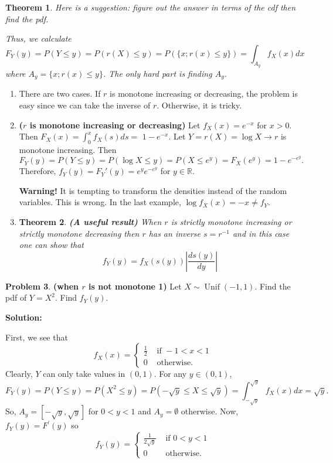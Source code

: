 \documentclass[13pt]{article}
\newtheorem{theorem}{Theorem}[section]
\theoremstyle{definition}
\newtheorem{problem}[theorem]{Problem}
\newenvironment{solution}
{\color{C2}\begin{framed}\begingroup\textbf{Solution:} }
  {\endgroup\end{framed}}
\theoremstyle{remark}
\newenvironment{remark}
  {\pushQED{\qed}\renewcommand{\qedsymbol}{$\triangle$}\remarkx}
  {\popQED\endremarkx}
\begin{document}
\begin{theorem}Here is a suggestion: figure out the answer in terms of the cdf then find the pdf. 

Thus, we calculate
$$
F_{Y}(y)=P(Y \leq y)=P(r(X) \leq y)=P(\{x ; r(x) \leq y\})=\int_{A_{y}} f_{X}(x) d x
$$
where $A_{y}=\{x ; r(x) \leq y\}$. The only hard part is finding $A_{y}$.
\end{theorem}

\begin{remark}\hfill
    \begin{enumerate}
        \item 
There are two cases. If $r$ is monotone increasing or decreasing, the problem is easy since we can take the inverse of $r$. Otherwise, it is tricky. 
\item \textbf{($r$ is monotone increasing or decreasing)} Let $f_{X}(x)=e^{-x}$ for $x>0$. Then $F_{X}(x)=\int_{0}^{x} f_{X}(s) d s=$ $1-e^{-x}$. Let $Y=r(X)=\log X \longrightarrow r$ is monotone increasing. Then
$$
F_{Y}(y)=P(Y \leq y)=P(\log X \leq y)=P\left(X \leq e^{y}\right)=F_{X}\left(e^{y}\right)=1-e^{-e^{y}} .
$$
Therefore, $f_{Y}(y)=F_Y'(y)=e^{y} e^{-e^{y}}$ for $y \in \mathbb{R}$.

\textbf{Warning!} It is tempting to transform the densities instead of the random variables. This is wrong. In the last example, $\log f_{X}(x)=-x \neq f_{Y}$.
\item \begin{theorem}
    \textbf{(A useful result)} When $r$ is strictly monotone increasing or strictly monotone decreasing then $r$ has an inverse $s=r^{-1}$ and in this case one can show that
$$
f_{Y}(y)=f_{X}(s(y))\left|\frac{d s(y)}{d y}\right|
$$
\end{theorem}
    \end{enumerate}
\end{remark}

\begin{problem}
    \textbf{(when $r$ is not monotone 1)} Let $X \sim \operatorname{Unif}(-1,1)$. Find the pdf of $Y=X^{2}$. Find $f_Y(y)$.
\end{problem}

\begin{solution}
    
    First, we see that
$$
f_{X}(x)= \begin{cases}\frac{1}{2} & \text { if }-1<x<1 \\ 0 & \text { otherwise. }\end{cases}
$$
Clearly, $Y$ can only take values in $(0,1)$. For any $y \in(0,1)$,
$$
F_{Y}(y)  =P(Y \leq y)=P\left(X^{2} \leq y\right)
=P(-\sqrt{y} \leq X \leq \sqrt{y})
=\int_{-\sqrt{y}}^{\sqrt{y}} f_{X}(x) d x=\sqrt{y}.
$$
So, $A_{y}=[-\sqrt{y}, \sqrt{y}]$ for $0<y<1$ and $A_{y}=\emptyset$ otherwise. Now, $f_{Y}(y)=F^{\prime}(y)$ so
$$
f_{Y}(y)= \begin{cases}\frac{1}{2 \sqrt{y}} & \text { if } 0<y<1 \\ 0 & \text { otherwise. }\end{cases}
$$
\end{solution}
\end{document}
